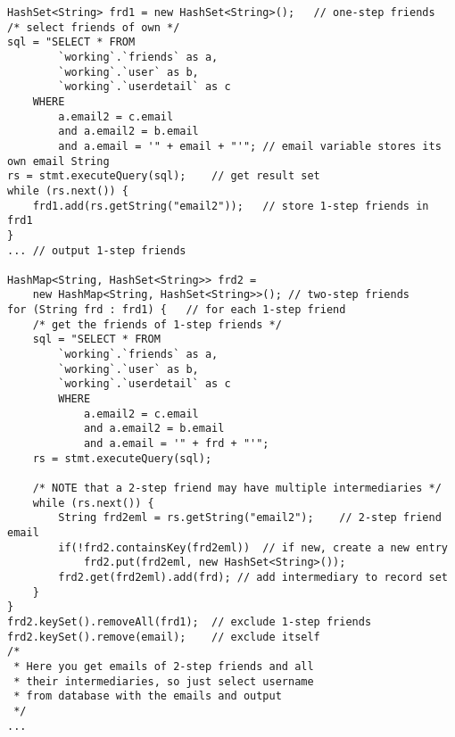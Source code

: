 \begin{lstlisting}
HashSet<String> frd1 = new HashSet<String>();	// one-step friends
/* select friends of own */
sql = "SELECT * FROM
		`working`.`friends` as a,
		`working`.`user` as b,
		`working`.`userdetail` as c
	WHERE
		a.email2 = c.email
		and a.email2 = b.email
		and a.email = '" + email + "'"; // email variable stores its own email String
rs = stmt.executeQuery(sql);	// get result set
while (rs.next()) {
	frd1.add(rs.getString("email2"));	// store 1-step friends in frd1
}
...	// output 1-step friends

HashMap<String, HashSet<String>> frd2 =
	new HashMap<String, HashSet<String>>(); // two-step friends
for (String frd : frd1) {	// for each 1-step friend
	/* get the friends of 1-step friends */
	sql = "SELECT * FROM
		`working`.`friends` as a,
		`working`.`user` as b,
		`working`.`userdetail` as c
		WHERE
			a.email2 = c.email
			and a.email2 = b.email
			and a.email = '" + frd + "'";
	rs = stmt.executeQuery(sql);

	/* NOTE that a 2-step friend may have multiple intermediaries */
	while (rs.next()) {
		String frd2eml = rs.getString("email2");	// 2-step friend email
		if(!frd2.containsKey(frd2eml))	// if new, create a new entry
			frd2.put(frd2eml, new HashSet<String>());
		frd2.get(frd2eml).add(frd);	// add intermediary to record set
	}
}
frd2.keySet().removeAll(frd1);	// exclude 1-step friends
frd2.keySet().remove(email);	// exclude itself
/*
 * Here you get emails of 2-step friends and all
 * their intermediaries, so just select username
 * from database with the emails and output
 */
...
\end{lstlisting}
